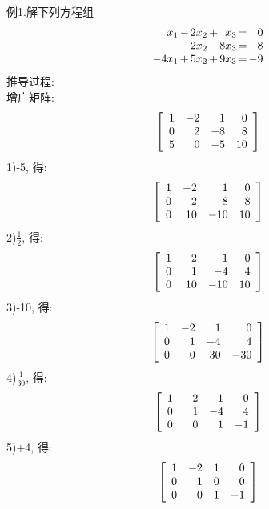 例1.解下列方程组\\
\[\begin{array}{r@{\hspace{1.5pt}}l@{\hspace{1.5pt}}r@{\hspace{1.5pt}}l@{\hspace{1.5pt}}r@{\hspace{1.5pt}}l@{\hspace{1.5pt}}r}
	x_1 & - & 2x_2 & + & x_3 & = & 0\\
	& & 2x_2 & - & 8x_3 & = & 8\\
	-4x_1 & + & 5x_2 & + & 9x_3 & = & -9
\end{array}\]
推导过程:\\
增广矩阵:\\
\[\left[\begin{array}{r r r r}
	1 & -2 & 1 & 0\\
	0 & 2 & -8 & 8\\
	5 & 0 & -5 & 10
\end{array}\right]\]
1)-5, 得:\\
\[\left[\begin{array}{r r r r r} 
	1 & -2 & 1 & 0\\
	0 & 2 & -8 & 8\\
	0 & 10 & -10 & 10
\end{array}\right]\]
2)$\frac{1}{2}$, 得:\\
\[\left[\begin{array}{r r r r r} 
	1 & -2 & 1 & 0\\
	0 & 1 & -4 & 4\\
	0 & 10 & -10 & 10
\end{array}\right]\]
3)-10, 得:\\
\[\left[\begin{array}{r r r r r} 
	1 & -2 & 1 & 0\\
	0 & 1 & -4 & 4\\
	0 & 0 & 30 & -30
\end{array}\right]\]
4)$\frac{1}{30}$, 得:\\
\[\left[\begin{array}{r r r r r} 
	1 & -2 & 1 & 0\\
	0 & 1 & -4 & 4\\
	0 & 0 & 1 & -1
\end{array}\right]\]
5)+4, 得:\\
\[\left[\begin{array}{r r r r r} 
	1 & -2 & 1 & 0\\
	0 & 1 & 0 & 0\\
	0 & 0 & 1 & -1
\end{array}\right]\]
